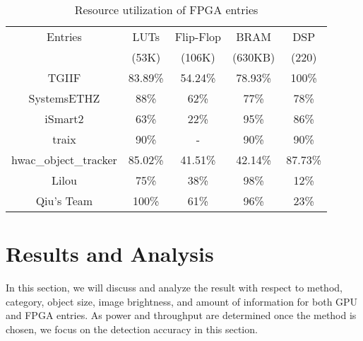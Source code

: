\documentclass[10pt,journal,compsoc]{IEEEtran}
\begin{document}
\begin{table}[htbp]
\caption{Resource utilization of FPGA entries}
\label{FPGA_resource}
\centering
\begin{tabular}{ccccc}
\hline
Entries     & LUTs    & Flip-Flop & BRAM    & DSP     \\%
            & (53K)     & (106K)      & (630KB)   & (220)     \\ \hline
TGIIF       & 83.89\% & 54.24\%   & 78.93\% & 100\%   \\
SystemsETHZ & 88\%    & 62\%      & 77\%    & 78\%    \\
iSmart2     & 63\%    & 22\%      & 95\%    & 86\%    \\
traix       & 90\%       & -         & 90\%       & 90\%       \\
hwac\_object\_tracker        & 85.02\% & 41.51\%   & 42.14\% & 87.73\% \\
Lilou       & 75\%    & 38\%      & 98\%    & 12\%    \\
Qiu's Team      & 100\%   & 61\%      & 96\%    & 23\%    \\ \hline
\end{tabular}
\end{table}





\section{Results and Analysis}

In this section, we will discuss and analyze the result with respect to method, category, object size, image brightness, and amount of information for both GPU and FPGA entries.
As power and throughput are determined once the method is chosen, we focus on the detection accuracy in this section.
\end{document}
